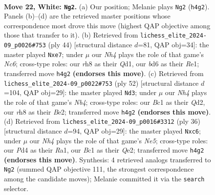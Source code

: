 \documentclass[11pt]{article}
\begin{document}
\clearpage

\begin{figure}[p]\centering
\begin{subfigure}{0.46\textwidth}\centering
\resizebox{\linewidth}{!}{%
\newchessgame
\chessboard[
  setfen={r6r/p2nk2p/1Npbp1p1/6q1/1p1P3N/P3P2P/1P6/R1BQ1RK1 w - - 0 22},
  showmover=false,
  pgfstyle=straightmove, color=movearrow, markmove={h4-g2}
]}
\caption{}
\end{subfigure}\hfill
\begin{subfigure}{0.46\textwidth}\centering
\resizebox{\linewidth}{!}{%
\newchessgame
\chessboard[
  setfen={4k2r/2rqbp2/b1N3p1/p1pPp2p/P7/6PP/1P3PB1/R2QR1K1 w k - 0 23},
  showmover=false,
  pgfstyle=straightmove, color=movearrow, markmove={c6-e7}
]}
\caption{}
\end{subfigure}
\\[4pt]
\begin{subfigure}{0.46\textwidth}\centering
\resizebox{\linewidth}{!}{%
\newchessgame
\chessboard[
  setfen={1r3rk1/5ppp/1q6/p2pP3/nNbP1R2/Pp6/1P1QB1PP/4R1K1 w - - 0 27},
  showmover=false,
  pgfstyle=straightmove, color=movearrow, markmove={b4-d3}
]}
\caption{}
\end{subfigure}\hfill
\begin{subfigure}{0.46\textwidth}\centering
\resizebox{\linewidth}{!}{%
\newchessgame
\chessboard[
  setfen={r3r1k1/4ppbp/2p3p1/4Nb2/1P1qpB2/P6P/4QPP1/R3R1K1 w - - 0 19},
  showmover=false,
  pgfstyle=straightmove, color=movearrow, markmove={e5-c6}
]}
\caption{}
\end{subfigure}
\caption{\textbf{Move 22, White: \texttt{Ng2}.} (a) Our position; Melanie plays \texttt{Ng2} (\texttt{h4g2}). Panels (b)--(d) are the retrieved master positions whose correspondence most drove this move (highest QAP objective among those that transfer to it). (b) Retrieved from \texttt{lichess\_elite\_2024-09\_p0026\#753} (ply 44) [structural distance $d$=81, QAP obj=34]: the master played \texttt{Nxe7}; under $\mu$ our \emph{Nh4} plays the role of that game's \emph{Nc6}; cross-type roles: our \emph{r}h8 as their \emph{Q}d1, our \emph{b}d6 as their \emph{R}e1; transferred move \texttt{h4g2} \textbf{(endorses this move)}. (c) Retrieved from \texttt{lichess\_elite\_2024-09\_p0022\#753} (ply 52) [structural distance $d$=104, QAP obj=29]: the master played \texttt{Nd3}; under $\mu$ our \emph{Nh4} plays the role of that game's \emph{Nb4}; cross-type roles: our \emph{B}c1 as their \emph{Q}d2, our \emph{r}h8 as their \emph{B}e2; transferred move \texttt{h4g2} \textbf{(endorses this move)}. (d) Retrieved from \texttt{lichess\_elite\_2024-09\_p0016\#3312} (ply 36) [structural distance $d$=94, QAP obj=29]: the master played \texttt{Nxc6}; under $\mu$ our \emph{Nh4} plays the role of that game's \emph{Ne5}; cross-type roles: our \emph{P}d4 as their \emph{R}a1, our \emph{B}c1 as their \emph{Q}e2; transferred move \texttt{h4g2} \textbf{(endorses this move)}. Synthesis: 4 retrieved analogs transferred to \texttt{Ng2} (summed QAP objective 111, the strongest correspondence among the candidate moves); Melanie committed it via the \texttt{search} selector.}
\label{fig:thought-m42}
\end{figure}
\end{document}
